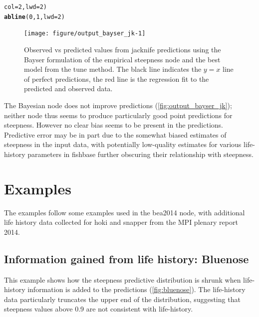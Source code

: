 \documentclass{dragonfly-report}\usepackage[]{graphicx}\usepackage[]{color}
\makeatletter
\newcommand{\hlnum}[1]{\textcolor[rgb]{0.686,0.059,0.569}{#1}}%
\newcommand{\hlstd}[1]{\textcolor[rgb]{0.345,0.345,0.345}{#1}}%
\newcommand{\hlkwc}[1]{\textcolor[rgb]{0.333,0.667,0.333}{#1}}%
\newcommand{\hlkwd}[1]{\textcolor[rgb]{0.737,0.353,0.396}{\textbf{#1}}}%
\newenvironment{kframe}{%
 \def\at@end@of@kframe{}%
 \ifinner\ifhmode%
  \def\at@end@of@kframe{\end{minipage}}%
  \begin{minipage}{\columnwidth}%
 \fi\fi%
 \def\FrameCommand##1{\hskip\@totalleftmargin \hskip-\fboxsep
 \colorbox{shadecolor}{##1}\hskip-\fboxsep
     \hskip-\linewidth \hskip-\@totalleftmargin \hskip\columnwidth}%
 \MakeFramed {\advance\hsize-\width
   \@totalleftmargin\z@ \linewidth\hsize
   \@setminipage}}%
 {\par\unskip\endMakeFramed%
 \at@end@of@kframe}
\newenvironment{knitrout}{}{} %
\makeatother
\begin{document}
\begin{knitrout}
\begin{kframe}
\begin{alltt}
    \hlkwc{col} \hlstd{=} \hlnum{2}\hlstd{,} \hlkwc{lwd} \hlstd{=} \hlnum{2}\hlstd{)}
\hlkwd{abline}\hlstd{(}\hlnum{0}\hlstd{,} \hlnum{1}\hlstd{,} \hlkwc{lwd} \hlstd{=} \hlnum{2}\hlstd{)}
\end{alltt}
\end{kframe}\begin{figure}
\texttt{[image: figure/output\_bayser\_jk-1]} \caption[Observed vs predicted values from jacknife predictions using the Bayser formulation of the empirical steepness node and the best model from the tune method]{Observed vs predicted values from jacknife predictions using the Bayser formulation of the empirical steepness node and the best model from the tune method. The black line indicates the $y=x$ line of perfect predictions, the red line is the regression fit to the predicted and observed data.\label{fig:output_bayser_jk}}
\end{figure}


\end{knitrout}

The Bayesian node does not improve predictions (\autoref{fig:output_bayser_jk}); neither node thus seems to produce particularly good point predictions for steepness. However no clear bias seems to be present in the predictions. Predictive error may be in part due to the somewhat biased estimates of steepness in the input data, with potentially low-quality estimates for various life-history parameters in fishbase further obscuring their relationship with steepness.

\section{Examples}

The examples follow some examples used in the bea2014 node, with additional life history data collected for hoki and snapper from the MPI plenary report 2014.

\subsection{Information gained from life history: Bluenose}

This example shows how the steepness predictive distribution is shrunk when life-history information is added to the predictions (\autoref{fig:bluenose}). The life-history data particularly truncates the upper end of the distribution, suggesting that steepness values above 0.9 are not consistent with life-history.
\end{document}
